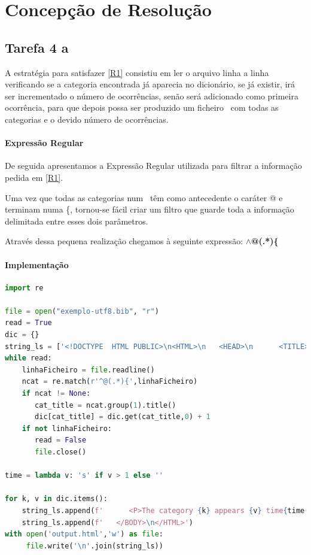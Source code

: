 \documentclass[11pt,a4paper]{report}
\begin{document}
\chapter{Concepção de Resolução }
\section{Tarefa 4 a}

A estratégia para satisfazer \ref{R1} consistiu em ler o arquivo linha a linha verificando se a categoria encontrada já aparecia no dicionário, se já existir, irá ser incrementado o número de ocorrências, senão será adicionado como primeira ocorrência, para que depois possa ser produzido um ficheiro \htlm\ com todas as categorias e o devido número de ocorrências.

\subsubsection{Expressão Regular}
De seguida apresentamos a Expressão Regular utilizada para filtrar a informação pedida em \ref{R1}.

Uma vez que todas as categorias num \bib\ têm como antecedente o caráter @ e terminam numa \{, tornou-se fácil criar um filtro que guarde toda a informação delimitada entre esses dois parâmetros.

Através dessa pequena realização chegamos à seguinte expressão: \textbf{$\land$@(.*)\{}

\newpage
\subsubsection{Implementação}
\begin{lstlisting}[language=python]
import re

file = open("exemplo-utf8.bib", "r")
read = True
dic = {}
string_ls = ['<!DOCTYPE  HTML PUBLIC>\n<HTML>\n   <HEAD>\n      <TITLE>Categories in BibTeX</TITLE>\n   </HEAD>\n   <BODY>']
while read:
    linhaFicheiro = file.readline()
    ncat = re.match(r'^@(.*){',linhaFicheiro)
    if ncat != None:
       cat_title = ncat.group(1).title()
       dic[cat_title] = dic.get(cat_title,0) + 1
    if not linhaFicheiro:
       read = False
       file.close()

time = lambda v: 's' if v > 1 else ''

for k, v in dic.items():
    string_ls.append(f'      <P>The category {k} appears {v} time{time(v)}.</P>')
    string_ls.append(f'   </BODY>\n</HTML>')
with open('output.html','w') as file:
     file.write('\n'.join(string_ls))
\end{lstlisting}
\end{document}
